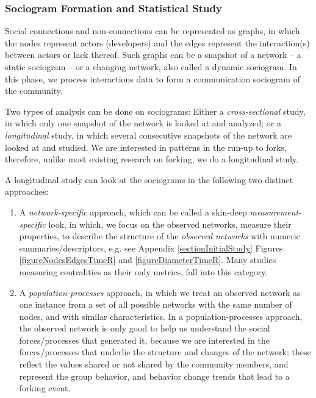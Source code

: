 \documentclass[12pt,letterpaper]{gthesis2}  %
\begin{document}
\subsubsection*{Sociogram Formation and Statistical Study}

Social connections and non-connections can be represented as graphs, in which the nodes represent actors (developers) and the edges represent the interaction(s) between actors or lack thereof. Such graphs can be a snapshot of a network -- a static sociogram -- or a changing network, also called a dynamic sociogram. In this phase, we process interactions data to form a communication sociogram of the community.

Two types of analysis can be done on sociograms: Either a \textit{cross-sectional} study, in which only one snapshot of the network is looked at and analyzed; or a \textit{longitudinal} study, in which several consecutive snapshots of the network are looked at and studied.  We are interested in patterns in the run-up to forks, therefore, unlike most existing research on forking, we do a longitudinal study.

A longitudinal study can look at the sociograms in the following two distinct approaches: 
\begin{enumerate}
\item A \textit{network-specific} approach, which can be called a skin-deep \textit{measurement-specific} look, in which, we focus on the observed networks, measure their properties, to describe the structure of the \textit{observed networks} with numeric summaries/descriptors, e.g. see Appendix \ref{sectionInitialStudy}
Figures \ref{figureNodesEdgesTimeR} and \ref{figureDiameterTimeR}. Many studies measuring centralities as their only metrics, fall into this category. 

\item A \textit{population-processes} approach, in which we treat an observed network as one instance from a set of all possible networks with the same number of nodes, and with similar characteristics. In a population-processes approach, the observed network is only good to help us understand the social forces/processes that generated it, because we are interested in the forces/processes that underlie the structure and changes of the network; these reflect the values shared or not shared by the community members, and represent the group behavior, and behavior change trends that lead to a forking event. 

\end{enumerate}
\end{document}
